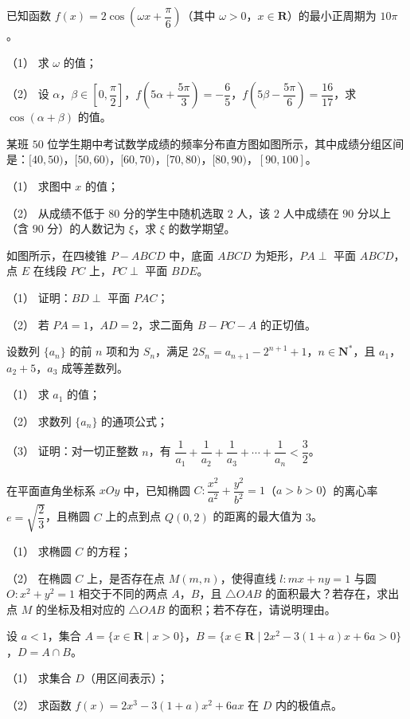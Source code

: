 \begin{question}
已知函数 $f(x)=2\cos\left(\omega x+\dfrac\pi6\right)$（其中 $\omega>0$，$x\in\mathbf R$）的最小正周期为 $10\pi$。

（1） 求 $\omega$ 的值；

（2） 设 $\alpha$，$\beta\in\left[0,\dfrac\pi2\right]$，$f\left(5\alpha+\dfrac{5\pi}{3}\right)=-\dfrac65$，$f\left(5\beta-\dfrac{5\pi}{6}\right)=\dfrac{16}{17}$，求 $\cos(\alpha+\beta)$ 的值。

\Needspace{0.4\textheight}
\end{question}
\begin{question}
某班 $50$ 位学生期中考试数学成绩的频率分布直方图如图所示，其中成绩分组区间是：$[40,50)$，$[50,60)$，$[60,70)$，$[70,80)$，$[80,90)$，$[90,100]$。
\nopagebreak[4]
\begin{center}\end{center}
\nopagebreak[4]
（1） 求图中 $x$ 的值；

（2） 从成绩不低于 $80$ 分的学生中随机选取 $2$ 人，该 $2$ 人中成绩在 $90$ 分以上（含 $90$ 分）的人数记为 $\xi$，求 $\xi$ 的数学期望。

\Needspace{0.4\textheight}
\end{question}
\begin{question}
如图所示，在四棱锥 $P-ABCD$ 中，底面 $ABCD$ 为矩形，$PA\perp$ 平面 $ABCD$，点 $E$ 在线段 $PC$ 上，$PC\perp$ 平面 $BDE$。

（1） 证明：$BD\perp$ 平面 $PAC$；

（2） 若 $PA=1$，$AD=2$，求二面角 $B-PC-A$ 的正切值。
\nopagebreak[4]
\begin{center}\end{center}
\nopagebreak[4]
\end{question}
\begin{question}
设数列 $\{a_n\}$ 的前 $n$ 项和为 $S_n$，满足 $2S_n=a_{n+1}-2^{n+1}+1$，$n\in\mathbf N^*$，且 $a_1$，$a_2+5$，$a_3$ 成等差数列。

（1） 求 $a_1$ 的值；

（2） 求数列 $\{a_n\}$ 的通项公式；

（3） 证明：对一切正整数 $n$，有 $\dfrac1{a_1}+\dfrac1{a_2}+\dfrac1{a_3}+\cdots+\dfrac1{a_n}<\dfrac32$。

\end{question}
\begin{question}
在平面直角坐标系 $xOy$ 中，已知椭圆 $C:\dfrac{x^2}{a^2}+\dfrac{y^2}{b^2}=1$（$a>b>0$）的离心率 $e=\sqrt{\dfrac23}$，且椭圆 $C$ 上的点到点 $Q(0,2)$ 的距离的最大值为 $3$。

（1） 求椭圆 $C$ 的方程；

（2） 在椭圆 $C$ 上，是否存在点 $M(m,n)$，使得直线 $l:mx+ny=1$ 与圆 $O:x^2+y^2=1$ 相交于不同的两点 $A$，$B$，且 $\triangle OAB$ 的面积最大？若存在，求出点 $M$ 的坐标及相对应的 $\triangle OAB$ 的面积；若不存在，请说明理由。

\end{question}
\begin{question}
设 $a<1$，集合 $A=\{x\in\mathbf R\mid x>0\}$，$B=\{x\in\mathbf R\mid 2x^2-3(1+a)x+6a>0\}$，$D=A\cap B$。

（1） 求集合 $D$（用区间表示）；

（2） 求函数 $f(x)=2x^3-3(1+a)x^2+6ax$ 在 $D$ 内的极值点。

\end{question}